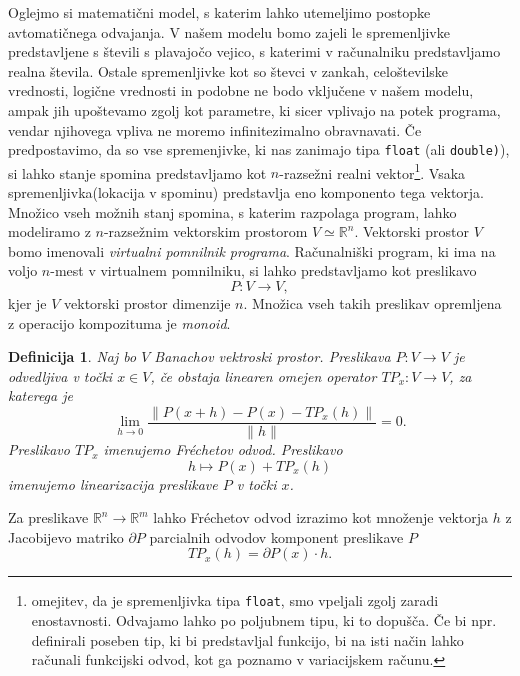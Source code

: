 \documentclass{article}
\newcommand{\RR}{\mathbb{R}}
\newcommand{\D}{\partial}
\newtheorem{definicija}{Definicija}[section]
\begin{document}
Oglejmo si matematični model, s katerim lahko utemeljimo postopke avtomatičnega
odvajanja. V našem modelu bomo zajeli le spremenljivke predstavljene s števili s
plavajočo vejico,  s katerimi v računalniku predstavljamo realna števila. 
Ostale spremenljivke kot so števci v zankah, celoštevilske vrednosti, logične
vrednosti in podobne ne bodo vključene v našem modelu, ampak jih upoštevamo
zgolj kot parametre, ki sicer vplivajo na potek programa, vendar njihovega
vpliva ne moremo infinitezimalno obravnavati. Če predpostavimo, da so vse
spremenjivke, ki nas zanimajo tipa \texttt{float} (ali \texttt{double)}), si lahko stanje spomina
predstavljamo kot $n$-razsežni realni vektor\footnote[1]{omejitev, da je
  spremenljivka tipa \texttt{float}, smo vpeljali zgolj zaradi enostavnosti.
  Odvajamo lahko po poljubnem tipu, ki to dopušča. Če bi npr. definirali
  poseben tip, ki bi predstavljal funkcijo, bi na isti način lahko računali
  funkcijski odvod, kot ga poznamo v variacijskem računu.}. Vsaka spremenljivka(lokacija v
spominu) predstavlja eno komponento tega vektorja. Množico vseh možnih stanj
spomina, s katerim razpolaga program, lahko modeliramo z $n$-razsežnim
vektorskim prostorom $V\simeq\RR^n$. Vektorski prostor $V$ bomo imenovali
\emph{virtualni pomnilnik programa}. Računalniški program, ki
ima na voljo $n$-mest v virtualnem pomnilniku, si lahko predstavljamo kot preslikavo
\begin{equation}
  \label{eq:program_kot_preslikava}
  P: V\to V,
\end{equation}
kjer je $V$ vektorski prostor dimenzije $n$. Množica vseh takih preslikav
opremljena z operacijo kompozituma je \emph{monoid}.
\begin{definicija}
  Naj bo $V$ Banachov vektroski prostor. Preslikava $P:V\to V$ je odvedljiva v
  točki $x\in V$, če obstaja
  linearen omejen operator $TP_x:V\to V$, za katerega je
  \begin{equation}
    \label{eq:frechet}
    \lim_{h\to 0}\frac{\|P(x+h)-P(x)-TP_x(h)\|}{\|h\|} = 0.
  \end{equation}
  Preslikavo $TP_x$ imenujemo \emph{Fréchetov odvod}. Preslikavo 
  \begin{equation}
    \label{eq:linearizacija}
    h\mapsto P(x)+TP_x(h)
  \end{equation}
 imenujemo \emph{linearizacija} preslikave $P$ v točki $x$.
\end{definicija}
Za preslikave $\RR^n\to \RR^m$ lahko Fréchetov odvod
izrazimo kot množenje vektorja $h$ z Jacobijevo matriko $\D P$ parcialnih odvodov
komponent preslikave $P$
\begin{equation*}
  TP_x(h) = \D P(x)\cdot h.
\end{equation*}
\end{document}
